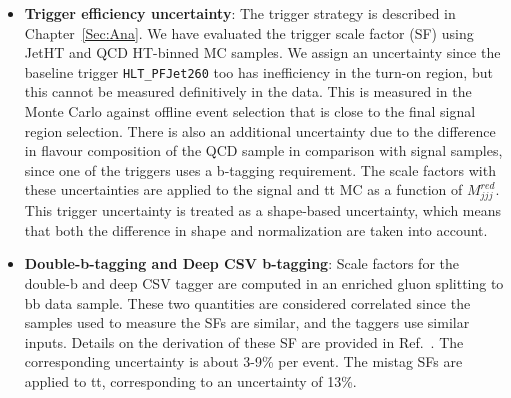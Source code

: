 \begin{itemize}
\item \textbf{Trigger efficiency uncertainty}: The trigger strategy is described in Chapter~\ref{Sec:Ana}. We have evaluated the trigger scale factor (SF) using JetHT and QCD HT-binned MC samples. We assign an uncertainty since the baseline trigger \texttt{HLT\_PFJet260} too has inefficiency in the turn-on region, but this cannot be measured definitively in the data. This is measured in the Monte Carlo against offline event selection that is close to the final signal region selection. There is also an additional uncertainty due to the difference in flavour composition of the QCD sample in comparison with signal samples, since one of the triggers uses a b-tagging requirement. The scale factors with these uncertainties are applied to the signal and tt MC as a function of $M_{jjj}^{red}$. This trigger uncertainty is treated as a shape-based uncertainty, which means that both the difference in shape and normalization are taken into account.
  
\item \textbf{Double-b-tagging and Deep CSV b-tagging}: Scale factors for the double-b and deep CSV tagger are computed in an enriched gluon splitting to bb data sample. These two quantities are considered correlated since the samples used to measure the SFs are similar, and the taggers use similar inputs. Details on the derivation of these SF are provided in Ref.~\cite{DoubleBSFTWiki}. The corresponding uncertainty is about 3-9\% per event. The mistag SFs are applied to tt, corresponding to an uncertainty of 13\%.


\end{itemize}
